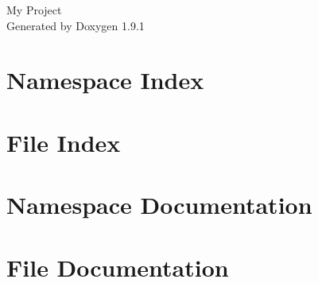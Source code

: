 \let\mypdfximage\pdfximage\def\pdfximage{\immediate\mypdfximage}\documentclass[twoside]{book}
\newcommand{\+}{\discretionary{\mbox{\scriptsize$\hookleftarrow$}}{}{}}
\newcommand{\clearemptydoublepage}{%
  \newpage{\pagestyle{empty}\cleardoublepage}%
}
\begin{document}
\raggedbottom

\hypersetup{pageanchor=false,
             bookmarksnumbered=true,
             pdfencoding=unicode
            }
\begin{titlepage}
\vspace*{7cm}
\begin{center}%
{\Large My Project }\\
\vspace*{1cm}
{\large Generated by Doxygen 1.9.1}\\
\end{center}
\end{titlepage}
\clearemptydoublepage
{}
\tableofcontents
\clearemptydoublepage
{}
\hypersetup{pageanchor=true}

\chapter{Namespace Index}

\chapter{File Index}

\chapter{Namespace Documentation}






\chapter{File Documentation}















\backmatter
\newpage
{}
\clearemptydoublepage
{}
\printindex
\end{document}
